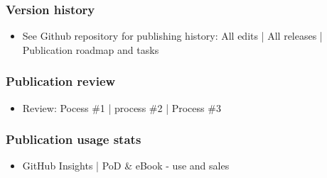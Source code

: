 \documentclass{article}
\begin{document}
\subsubsection{Version history}\label{H288689}


\begin{itemize}
\item See Github repository for publishing history: All edits | All releases | Publication roadmap and tasks


\end{itemize}

\subsubsection{Publication review }\label{H3767141}


\begin{itemize}
\item Review: Pocess \#1 | process \#2 | Process \#3


\end{itemize}

\subsubsection{Publication usage stats}\label{H3133638}


\begin{itemize}
\item GitHub Insights | PoD \& eBook - use and sales


\end{itemize}
\end{document}
